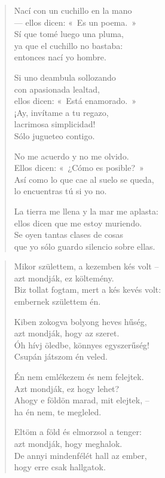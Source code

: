 \documentclass[11pt]{book}
\newcommand*{\centeredornament}{\centerline{\pgfornament[width=6cm]{88}}}
\begin{document}
\begin{verse}
  Nací con un cuchillo en la mano \\
  --- ellos dicen: «~Es un poema.~» \\
  Sí que tomé luego una pluma, \\
  ya que el cuchillo no bastaba: \\
  entonces nací yo hombre.

  Si uno deambula sollozando \\
  con apasionada lealtad, \\
  ellos dicen: «~Está enamorado.~» \\
  ¡Ay, invítame a tu regazo, \\
  lacrimosa simplicidad! \\
  Sólo jugueteo contigo.

  No me acuerdo y no me olvido. \\
  Ellos dicen: «~¿Cómo es posible?~» \\
  Así como lo que cae al suelo se queda, \\
  lo encuentras tú si yo no.

  La tierra me llena y la mar me aplasta: \\
  ellos dicen que me estoy muriendo. \\
  Se oyen tantas clases de cosas \\
  que yo sólo guardo silencio sobre ellas.
\end{verse}

\newpage

\vspace*{-15mm}
\centeredornament



\begin{verse}
  Mikor születtem, a kezemben kés volt -- \\
  azt mondják, ez költemény. \\
  Biz tollat fogtam, mert a kés kevés volt: \\
  embernek születtem én.

  Kiben zokogva bolyong heves hűség, \\
  azt mondják, hogy az szeret. \\
  Óh hívj öledbe, könnyes egyszerűség! \\
  Csupán játszom én veled.

  Én nem emlékezem és nem felejtek. \\
  Azt mondják, ez hogy lehet? \\
  Ahogy e földön marad, mit elejtek, -- \\
  ha én nem, te megleled.

  Eltöm a föld és elmorzsol a tenger: \\
  azt mondják, hogy meghalok. \\
  De annyi mindenfélét hall az ember, \\
  hogy erre csak hallgatok.
\end{verse}
\end{document}
